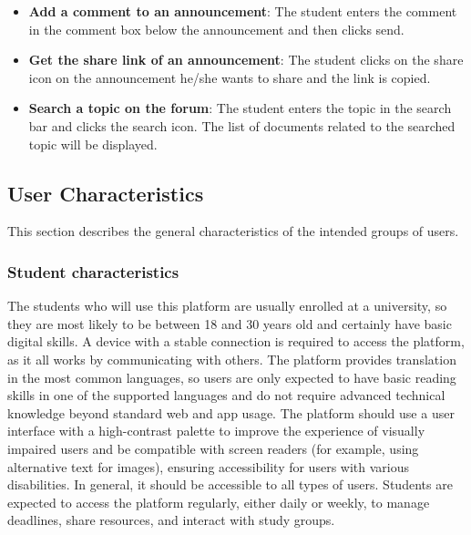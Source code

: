 \documentclass{article}
\begin{document}
\begin{itemize}
    \item \textbf{Add a comment to an announcement}: The student enters the comment in the comment box below the announcement and then clicks send.
    \item \textbf{Get the share link of an announcement}: The student clicks on the share icon on the announcement he/she wants to share and the link is copied.
    \item \textbf{Search a topic on the forum}: The student enters the topic in the search bar and clicks the search icon. The list of documents related to the searched topic will be displayed.
\end{itemize}


\clearpage
\subsection{User Characteristics}
This section describes the general characteristics of the intended groups of users.
\subsubsection{Student characteristics}
The students who will use this platform are usually enrolled at a university, so they are most likely to be between 18 and 30 years old and certainly have basic digital skills. A device with a stable connection is required to access the platform, as it all works by communicating with others. The platform provides translation in the most common languages, so users are only expected to have basic reading skills in one of the supported languages and do not require advanced technical knowledge beyond standard web and app usage. The platform should use a user interface with a high-contrast palette to improve the experience of visually impaired users and be compatible with screen readers (for example, using alternative text for images), ensuring accessibility for users with various disabilities. In general, it should be accessible to all types of users. Students are expected to access the platform regularly, either daily or weekly, to manage deadlines, share resources, and interact with study groups.
\end{document}
